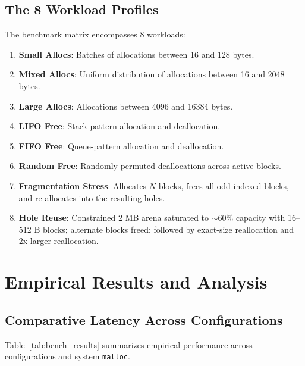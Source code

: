 \documentclass[11pt,a4paper]{article}
\begin{document}
\subsection{The 8 Workload Profiles}
The benchmark matrix encompasses 8 workloads:
\begin{enumerate}
    \item \textbf{Small Allocs}: Batches of allocations between 16 and 128 bytes.
    \item \textbf{Mixed Allocs}: Uniform distribution of allocations between 16 and 2048 bytes.
    \item \textbf{Large Allocs}: Allocations between 4096 and 16384 bytes.
    \item \textbf{LIFO Free}: Stack-pattern allocation and deallocation.
    \item \textbf{FIFO Free}: Queue-pattern allocation and deallocation.
    \item \textbf{Random Free}: Randomly permuted deallocations across active blocks.
    \item \textbf{Fragmentation Stress}: Allocates $N$ blocks, frees all odd-indexed blocks, and re-allocates into the resulting holes.
    \item \textbf{Hole Reuse}: Constrained 2 MB arena saturated to $\sim 60\%$ capacity with 16--512 B blocks; alternate blocks freed; followed by exact-size reallocation and 2x larger reallocation.
\end{enumerate}

\section{Empirical Results and Analysis}

\subsection{Comparative Latency Across Configurations}
Table~\ref{tab:bench_results} summarizes empirical performance across configurations and system \texttt{malloc}.
\end{document}
